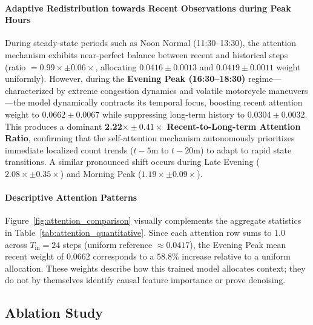 \documentclass[journal,twocolumn]{IEEEtran}
\begin{document}
\paragraph{Adaptive Redistribution towards Recent Observations during Peak Hours} During steady-state periods such as Noon Normal (11:30--13:30), the attention mechanism exhibits near-perfect balance between recent and historical steps (ratio $= 0.99\times \pm 0.06\times$, allocating $0.0416 \pm 0.0013$ and $0.0419 \pm 0.0011$ weight uniformly). However, during the \textbf{Evening Peak (16:30--18:30)} regime—characterized by extreme congestion dynamics and volatile motorcycle maneuvers—the model dynamically contracts its temporal focus, boosting recent attention weight to $0.0662 \pm 0.0067$ while suppressing long-term history to $0.0304 \pm 0.0032$. This produces a dominant \textbf{2.22$\times \pm 0.41\times$ Recent-to-Long-term Attention Ratio}, confirming that the self-attention mechanism autonomously prioritizes immediate localized count trends ($t-5\text{m}$ to $t-20\text{m}$) to adapt to rapid state transitions. A similar pronounced shift occurs during Late Evening ($2.08\times \pm 0.35\times$) and Morning Peak ($1.19\times \pm 0.09\times$).

\paragraph{Descriptive Attention Patterns} Figure~\ref{fig:attention_comparison} visually complements the aggregate statistics in Table~\ref{tab:attention_quantitative}. Since each attention row sums to $1.0$ across $T_{\text{in}} = 24$ steps (uniform reference $\approx 0.0417$), the Evening Peak mean recent weight of $0.0662$ corresponds to a $58.8\%$ increase relative to a uniform allocation. These weights describe how this trained model allocates context; they do not by themselves identify causal feature importance or prove denoising.

\subsection{Ablation Study}
\end{document}
